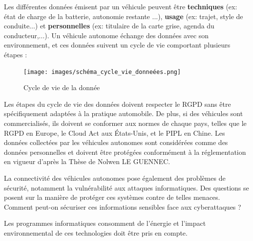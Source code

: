 Les différentes données émisent par un véhicule peuvent être \textbf{techniques} (ex: état de charge de la batterie, autonomie restante ...), \textbf{usage} (ex: trajet, style de conduite...) et \textbf{personnelles} (ex: titulaire de la carte grise, agenda du conducteur,...).
Un véhicule autonome échange des données avec son environnement, et ces données suivent un cycle de vie comportant plusieurs étapes :

\begin{figure}[h]
    \centering
    \texttt{[image: images/schéma\_cycle\_vie\_donneées.png]} 
    \caption{Cycle de vie de la donnée}
\end{figure}

Les étapes du cycle de vie des données doivent respecter le RGPD sans être spécifiquement adaptées à la pratique automobile. De plus, si des véhicules sont commercialisés, ils doivent se conformer aux normes de chaque pays, telles que le RGPD en Europe, le Cloud Act aux États-Unis, et le PIPL en Chine. Les données collectées par les véhicules autonomes sont considérées comme des données personnelles et doivent être protégées conformément à la réglementation en vigueur d'après la Thèse de Nolwen LE GUENNEC\cite{le_gennec_machine_2023}.

La connectivité des véhicules autonomes pose également des problèmes de sécurité, notamment la vulnérabilité aux attaques informatiques. Des questions se posent sur la manière de protéger ces systèmes contre de telles menaces. Comment peut-on sécuriser ces informations sensibles face aux cyberattaques ?



Les programmes informatiques consomment de l’énergie et l'impact environnemental de ces technologies doit être pris en compte.

